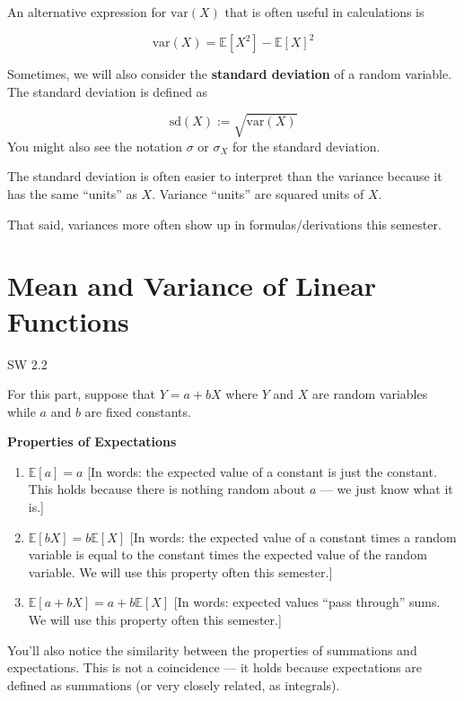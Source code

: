 \documentclass[
  letterpaper,
  DIV=11,
  numbers=noendperiod]{scrreprt}
\begin{document}
An alternative expression for \(\mathrm{var}(X)\) that is often useful
in calculations is

\[
  \mathrm{var}(X) = \mathbb{E}[X^2] - \mathbb{E}[X]^2
\]

Sometimes, we will also consider the \textbf{standard deviation} of a
random variable. The standard deviation is defined as

\[
  \textrm{sd}(X) := \sqrt{\mathrm{var}(X)}
\] You might also see the notation \(\sigma\) or \(\sigma_X\) for the
standard deviation.

The standard deviation is often easier to interpret than the variance
because it has the same ``units'' as \(X\). Variance ``units'' are
squared units of \(X\).

That said, variances more often show up in formulas/derivations this
semester.

\section{Mean and Variance of Linear
Functions}\label{mean-and-variance-of-linear-functions}

SW 2.2

For this part, suppose that \(Y=a + bX\) where \(Y\) and \(X\) are
random variables while \(a\) and \(b\) are fixed constants.

\textbf{Properties of Expectations}

\begin{enumerate}
\def\labelenumi{\arabic{enumi}.}
\item
  \(\mathbb{E}[a] = a\) {[}In words: the expected value of a constant is
  just the constant. This holds because there is nothing random about
  \(a\) --- we just know what it is.{]}
\item
  \(\mathbb{E}[bX] = b\mathbb{E}[X]\) {[}In words: the expected value of
  a constant times a random variable is equal to the constant times the
  expected value of the random variable. We will use this property often
  this semester.{]}
\item
  \(\mathbb{E}[a + bX] = a + b\mathbb{E}[X]\) {[}In words: expected
  values ``pass through'' sums. We will use this property often this
  semester.{]}
\end{enumerate}

You'll also notice the similarity between the properties of summations
and expectations. This is not a coincidence --- it holds because
expectations are defined as summations (or very closely related, as
integrals).
\end{document}
